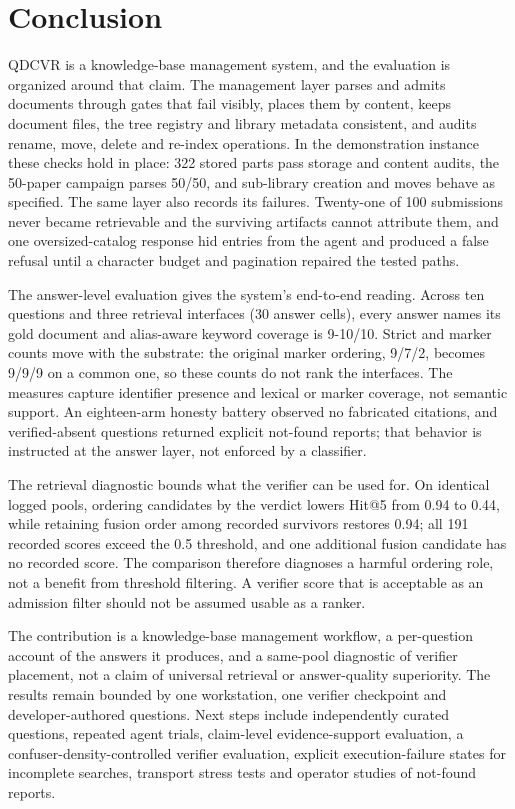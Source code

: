 \section{Conclusion}
\label{sec:conclusion}

QDCVR is a knowledge-base management system, and the evaluation is organized
around that claim. The management layer parses and admits documents through
gates that fail visibly, places them by content, keeps document files, the
tree registry and library metadata consistent, and audits rename, move, delete
and re-index operations. In the demonstration instance these checks hold in
place: 322 stored parts pass storage and content audits, the 50-paper campaign
parses 50/50, and sub-library creation and moves behave as specified. The same
layer also records its failures. Twenty-one of 100 submissions never became
retrievable and the surviving artifacts cannot attribute them, and one
oversized-catalog response hid entries from the agent and produced a false
refusal until a character budget and pagination repaired the tested paths.

The answer-level evaluation gives the system's end-to-end reading. Across ten
questions and three retrieval interfaces (30 answer cells), every answer names
its gold document and alias-aware keyword coverage is 9-10/10. Strict and
marker counts move with the substrate: the original marker ordering, 9/7/2,
becomes 9/9/9 on a common one, so these counts do not rank the interfaces.
The measures capture identifier presence and lexical or marker coverage, not
semantic support. An eighteen-arm honesty battery observed no fabricated
citations, and verified-absent questions returned explicit not-found reports;
that behavior is instructed at the answer layer, not enforced by a classifier.

The retrieval diagnostic bounds what the verifier can be used for. On
identical logged pools, ordering candidates by the verdict lowers Hit@5 from
0.94 to 0.44, while retaining fusion order among recorded survivors restores
0.94; all 191 recorded scores exceed the 0.5 threshold, and one additional
fusion candidate has no recorded score. The comparison therefore diagnoses a
harmful ordering role, not a benefit from threshold filtering. A verifier
score that is acceptable as an admission filter should not be assumed usable
as a ranker.

The contribution is a knowledge-base management workflow, a per-question
account of the answers it produces, and a same-pool diagnostic of verifier
placement, not a claim of universal retrieval or answer-quality superiority.
The results remain bounded by one workstation, one verifier checkpoint and
developer-authored questions. Next steps include independently curated
questions, repeated agent trials, claim-level evidence-support evaluation, a
confuser-density-controlled verifier evaluation, explicit execution-failure
states for incomplete searches, transport stress tests and operator studies
of not-found reports.

